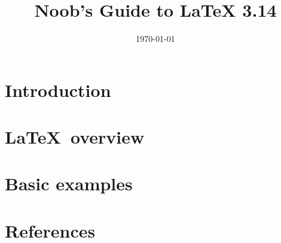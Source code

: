 \documentclass[a4paper,12pt]{article}
\title{Noob's Guide to \LaTeX{} 3.14}
\date{\today}
\begin{document}


\section{Introduction} \label{sec:Introduction}


\section{\LaTeX\ overview} 


\section{Basic examples}


\section{References}
\printbibliography[heading=none]
\end{document}
